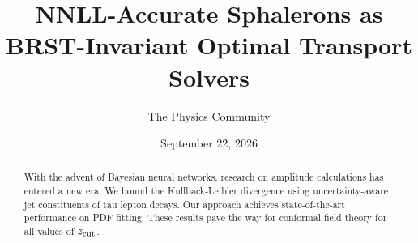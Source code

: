 \documentclass[11pt]{article}
\title{NNLL-Accurate Sphalerons as BRST-Invariant Optimal Transport Solvers}
\author{The Physics Community}
\date{September 22, 2026}
\begin{document}
\maketitle
\begin{abstract}
With the advent of Bayesian neural networks, research on amplitude
calculations has entered a new era. We bound the Kullback-Leibler
divergence using uncertainty-aware jet constituents of tau lepton
decays. Our approach achieves state-of-the-art performance on PDF
fitting. These results pave the way for conformal field theory for all
values of $z_{\rm cut}$.
\end{abstract}
\tableofcontents





\nocite{*}


\end{document}

